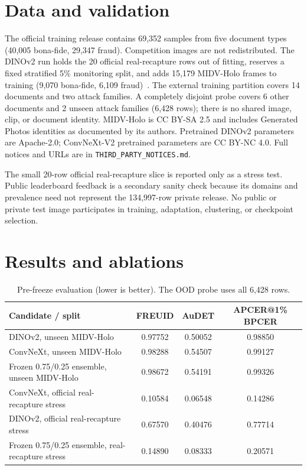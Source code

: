 \documentclass[10pt,a4paper]{article}
\begin{document}
\section{Data and validation}
The official training release contains 69,352 samples from five document types (40,005 bona-fide,
29,347 fraud). Competition images are not redistributed. The DINOv2 run holds the 20 official
real-recapture rows out of fitting, reserves a fixed stratified 5\% monitoring split, and adds
15,179 MIDV-Holo frames to training (9,070 bona-fide, 6,109 fraud)~\cite{midvholo}. The external
training partition covers 14 documents and two attack families. A completely disjoint probe covers
6 other documents and 2 unseen attack families (6,428 rows); there is no shared image, clip, or
document identity. MIDV-Holo is CC BY-SA 2.5 and includes Generated Photos identities as documented
by its authors. Pretrained DINOv2 parameters are Apache-2.0; ConvNeXt-V2 pretrained parameters are
CC BY-NC 4.0. Full notices and URLs are in \texttt{THIRD\_PARTY\_NOTICES.md}.

The small 20-row official real-recapture slice is reported only as a stress test. Public leaderboard
feedback is a secondary sanity check because its domains and prevalence need not represent the
134,997-row private release. No public or private test image participates in training, adaptation,
clustering, or checkpoint selection.

\section{Results and ablations}
\begin{table}[h]
\centering\small
\caption{Pre-freeze evaluation (lower is better). The OOD probe uses all 6,428 rows.}
\begin{tabular}{lccc}
\toprule
Candidate / split & FREUID & AuDET & APCER@1\% BPCER\\
\midrule
DINOv2, unseen MIDV-Holo & 0.97752 & 0.50052 & 0.98850\\
ConvNeXt, unseen MIDV-Holo & 0.98288 & 0.54507 & 0.99127\\
Frozen 0.75/0.25 ensemble, unseen MIDV-Holo & 0.98672 & 0.54191 & 0.99326\\
ConvNeXt, official real-recapture stress & 0.10584 & 0.06548 & 0.14286\\
DINOv2, official real-recapture stress & 0.67570 & 0.40476 & 0.77714\\
Frozen 0.75/0.25 ensemble, real-recapture stress & 0.14890 & 0.08333 & 0.20571\\
\bottomrule
\end{tabular}
\end{table}
\end{document}
